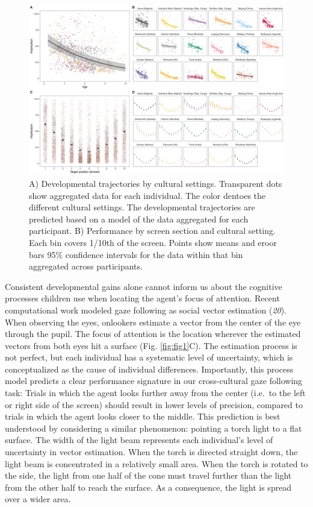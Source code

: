 \documentclass[
  man,floatsintext]{apa6}
\begin{document}
\begin{figure}

{\centering \includegraphics[width=0.75\linewidth]{../visuals/pvis_pred} 

}

\caption{A) Developmental trajectories by cultural settings. Transparent dots show aggregated data for each individual. The color dentoes the different cultural settings. The developmental trajectories are predicted based on a model of the data aggregated for each participant. B) Performance by screen section and cultural setting. Each bin covers 1/10th of the screen. Points show means and eroor bars 95\% confidence intervals for the data within that bin aggregated across participants.}\label{fig:fig2}
\end{figure}

Consistent developmental gains alone cannot inform us about the cognitive processes children use when locating the agent's focus of attention. Recent computational work modeled gaze following as social vector estimation (\emph{20}). When observing the eyes, onlookers estimate a vector from the center of the eye through the pupil. The focus of attention is the location wherever the estimated vectors from both eyes hit a surface (Fig. \ref{fig:fig1}C). The estimation process is not perfect, but each individual has a systematic level of uncertainty, which is conceptualized as the cause of individual differences. Importantly, this process model predicts a clear performance signature in our cross-cultural gaze following task: Trials in which the agent looks further away from the center (i.e.~to the left or right side of the screen) should result in lower levels of precision, compared to trials in which the agent looks closer to the middle. This prediction is best understood by considering a similar phenomenon: pointing a torch light to a flat surface. The width of the light beam represents each individual's level of uncertainty in vector estimation. When the torch is directed straight down, the light beam is concentrated in a relatively small area. When the torch is rotated to the side, the light from one half of the cone must travel further than the light from the other half to reach the surface. As a consequence, the light is spread over a wider area.
\end{document}
